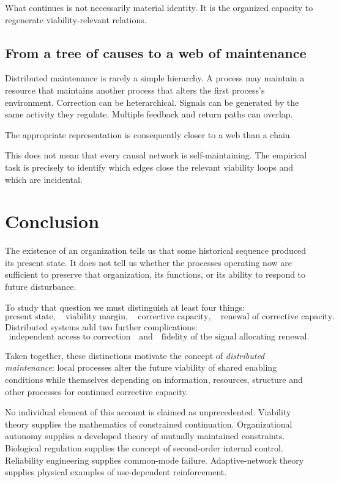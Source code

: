 What continues is not necessarily material identity. It is the organized capacity to regenerate viability-relevant relations.

\subsection{From a tree of causes to a web of maintenance}

Distributed maintenance is rarely a simple hierarchy. A process may maintain a resource that maintains another process that alters the first process's environment. Correction can be heterarchical. Signals can be generated by the same activity they regulate. Multiple feedback and return paths can overlap.

The appropriate representation is consequently closer to a web than a chain.

This does not mean that every causal network is self-maintaining. The empirical task is precisely to identify which edges close the relevant viability loops and which are incidental.

\section{Conclusion}

The existence of an organization tells us that some historical sequence produced its present state. It does not tell us whether the processes operating now are sufficient to preserve that organization, its functions, or its ability to respond to future disturbance.

To study that question we must distinguish at least four things:
\[
\boxed{
\text{present state},
\quad
\text{viability margin},
\quad
\text{corrective capacity},
\quad
\text{renewal of corrective capacity}.
}
\]
Distributed systems add two further complications:
\[
\boxed{
\text{independent access to correction}
\quad\text{and}\quad
\text{fidelity of the signal allocating renewal}.
}
\]

Taken together, these distinctions motivate the concept of \emph{distributed maintenance}: local processes alter the future viability of shared enabling conditions while themselves depending on information, resources, structure and other processes for continued corrective capacity.

No individual element of this account is claimed as unprecedented. Viability theory supplies the mathematics of constrained continuation. Organizational autonomy supplies a developed theory of mutually maintained constraints. Biological regulation supplies the concept of second-order internal control. Reliability engineering supplies common-mode failure. Adaptive-network theory supplies physical examples of use-dependent reinforcement.

